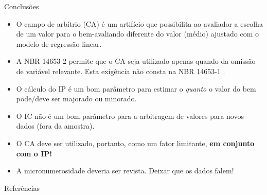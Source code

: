 \documentclass[9pt,ignorenonframetext,aspectratio=169]{beamer}
\newif\ifbibliography
\providecommand{\tightlist}{%
  \setlength{\itemsep}{0pt}\setlength{\parskip}{0pt}}
\begin{document}
\begin{frame}{Conclusões}

\begin{itemize}[<+->]
\tightlist
\item
  \alert<1>{O campo de arbítrio (CA) é um artifício que possibilita ao 
  avaliador a escolha de um valor para o bem-avaliando diferente do valor (médio) 
  ajustado com o modelo de regressão linear.}
\end{itemize}

\begin{itemize}[<+->]
\tightlist
\item
  \alert<2>{A NBR 14653-2 \citeyear{NBR1465302} permite que o CA seja 
  utilizado apenas quando da omissão de variável relevante. Esta exigência não 
  consta na NBR 14653-1 \citeyear{NBR1465301}.}
\end{itemize}

\begin{itemize}[<+->]
\tightlist
\item
  \alert<3>{O cálculo do IP é um bom parâmetro para estimar o \emph{quanto} o 
  valor do bem pode/deve ser majorado ou minorado.}
\end{itemize}

\begin{itemize}[<+->]
\tightlist
\item
  \alert<4>{O IC não é um bom parâmetro para a arbitragem de valores para novos
  dados (fora da amostra).}
\end{itemize}

\begin{itemize}[<+->]
\tightlist
\item
  \alert<5>{O CA deve ser utilizado, portanto, como um fator limitante, 
  \textbf{em conjunto com o IP!}}
\end{itemize}

\begin{itemize}[<+->]
\tightlist
\item
  \alert<6>{A micronumerosidade deveria ser revista. Deixar que os dados falem!}
\end{itemize}

\end{frame}


  \begin{frame}[allowframebreaks]{Referências}
  \bibliographytrue
  \printbibliography[heading=none]
  \end{frame}
\end{document}
